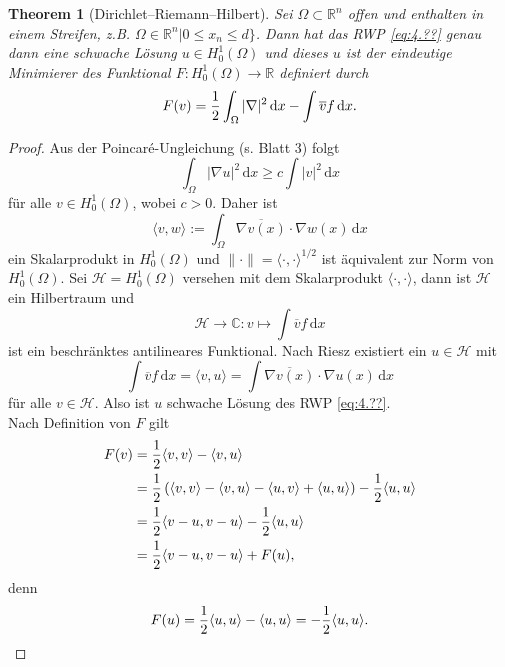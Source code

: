 \documentclass[
paper=a4,
bibtotocnumbered,
liststotocnumbered,
tablecaptionabove,
pointlessnumbers,
twoside,
openright,
10pt
]
{report}
\let\Re\relax\let\Im\relax
\DeclareMathOperator{\Re}{Re}
\DeclareMathOperator{\Im}{Im}
\newtheorem{thm}{Theorem}[chapter]
\theoremstyle{definition}
\numberwithin{equation}{chapter}
\begin{document}
\begin{thm}[Dirichlet--Riemann--Hilbert]
Sei $\Omega \subset \mathbb R^n$ offen und enthalten in einem Streifen, z.B. $\Omega \in \mathbb R^n|0\le x_n\le d\}$. Dann hat das RWP \eqref{eq:4.??} genau dann eine schwache Lösung $u\in H_0^1(\Omega)$ und dieses $u$ ist der eindeutige Minimierer des Funktional $F: H_0^1(\Omega) \to \mathbb R$ definiert durch
\begin{equation}
F(v) = \frac{1}{2} \int_\Omega |\nabla|^2\, \mathrm dx - \Re \int \overline v f\, \mathrm dx.
\end{equation}
\end{thm}
\begin{proof}
Aus der Poincar\'e-Ungleichung (s. Blatt 3) folgt
\begin{equation}
\int_\Omega |\nabla u|^2\, \mathrm dx \ge c \int |v|^2\, \mathrm dx
\end{equation}
für alle $v\in H_0^1(\Omega)$, wobei $c>0$. Daher ist
\begin{equation}
\langle v,w\rangle := \int_\Omega \overline{\nabla v(x)} \cdot \nabla w(x) \, \mathrm dx
\end{equation}
ein Skalarprodukt in $H_0^1(\Omega)$ und $\| \cdot \| = \langle\cdot ,\cdot \rangle ^{1/2}$ ist äquivalent zur Norm von $H_0^1(\Omega)$. Sei $\mathcal{H}= H_0^1(\Omega)$ versehen mit dem Skalarprodukt $\langle \cdot, \cdot \rangle$, dann ist $\mathcal{H}$ ein Hilbertraum und 
\begin{equation}
\mathcal{H} \to \mathbb C: v\mapsto \int \overline v f\, \mathrm dx
\end{equation}
ist ein beschränktes antilineares Funktional. Nach Riesz existiert ein $u\in \mathcal{H}$ mit
\begin{equation}
\int \overline v f \, \mathrm dx = \langle v, u\rangle = \int \overline{\nabla v(x)} \cdot \nabla u(x) \, \mathrm dx
\end{equation}
für alle $v\in \mathcal{H}$. Also ist $u$ schwache Lösung des RWP \eqref{eq:4.??}.
\\
Nach Definition von $F$ gilt
\begin{align}
F(v) &= \frac{1}{2} \langle v,v\rangle - \Re \langle v, u\rangle\\
&= \frac{1}{2} \left ( \langle v,v\rangle - \langle v, u\rangle - \langle u,v\rangle + \langle u,u\rangle \right ) - \frac{1}{2} \langle u,u\rangle\\
&= \frac{1}{2} \langle v-u, v-u \rangle - \frac{1}{2} \langle u, u\rangle \\
&= \frac{1}{2} \langle v-u, v-u\rangle + F(u),
\end{align}
denn
\begin{equation}
F(u) = \frac{1}{2} \langle u, u\rangle - \Re \langle u, u\rangle = - \frac{1}{2} \langle u, u \rangle.
\end{equation}
\end{proof}
\end{document}
